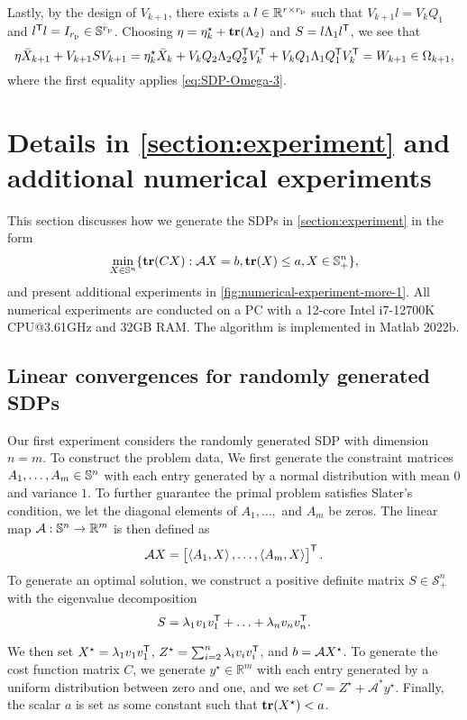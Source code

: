 \documentclass[11pt]{article}
\begin{document}
Lastly, by the design of $V_{k+1}$, there exists a $l \in \mathbb{R}^{r \times r_{\mathrm{p}}}$  such that $V_{k+1}l=V_kQ_1$ and $l^{\mathsf{ T}} l = I_{r_{\mathrm{p}}}\in \mathbb{S}^{r_\mathrm{p}}$. Choosing $\eta = \eta^\star_k + \mathop{\bf tr}(\Lambda_2)$ and $S = l \Lambda_1 l^{\mathsf{ T}}$, we see that $$\eta \Bar{X}_{k+1} + V_{k+1} S V_{k+1} = \eta^\star_k \bar{X}_{k} + V_k Q_2 \Lambda_2 Q_2^{\mathsf{ T}} V_k^{\mathsf{ T}} + V_k Q_1 \Lambda_1 Q_1^{\mathsf{ T}} V_k^{\mathsf{ T}} =W_{k+1} \in \Omega_{k+1},$$
where the first equality applies \eqref{eq:SDP-Omega-3}.


\section{Details in \cref{section:experiment} and additional numerical experiments}
\label{apx:section:detail-numerical}
This section discusses how we generate the SDPs in \cref{section:experiment} in the form 
\begin{align*}
    \min_{X \in \mathbb{S}^n} \{ \mathop{\bf tr}(CX) : \mathcal{A} X = b, \mathop{\bf tr}(X) \leq a ,X \in \mathbb{S}^n_+\},
\end{align*}
and present additional experiments in \cref{fig:numerical-experiment-more-1}. All numerical experiments are conducted on a PC with a 12-core Intel i7-12700K CPU@3.61GHz and 32GB RAM. The algorithm is implemented in Matlab 2022b. 
\subsection{Linear convergences for randomly generated SDPs}
\label{apx:subsection-randomly}
Our first experiment considers the randomly generated SDP with dimension $n = m.$ To construct the problem data, We first generate the constraint matrices $A_1, \ldots, A_m \in \mathbb{S}^n$ with each entry generated by a normal distribution with mean $0$ and variance $1$.
To further guarantee the primal problem satisfies Slater's condition, we let the diagonal elements of $A_1, \ldots,$ and $ A_m$ be zeros. The linear map $\mathcal{A} : \mathbb{S}^n \to \mathbb{R}^m$ is then defined as 
\begin{align*}
    \mathcal{A} X = \begin{bmatrix}
        \left \langle A_1, X \right\rangle,\ldots,\left \langle A_m, X \right\rangle
    \end{bmatrix}^{\mathsf{ T}}.
\end{align*}
To generate an optimal solution, we construct a positive definite matrix \( S \in \mathcal{S}_+^n \) with the eigenvalue decomposition
\[
S =\lambda_1  v_1  v_1^{\mathsf{ T}} + \ldots + \lambda_n v_n  v_n^{\mathsf{ T}}.
\]

We then set \( X^\star = \lambda_1 v_1 v_1^{\mathsf{ T}} \), \( Z^\star = \sum_{i=2}^n \lambda_i v_i v_i^{\mathsf{ T}} \), and \( b = \mathcal{A} X^\star \). To generate the cost function matrix \( C \), we generate \( y^\star \in \mathbb{R}^m \) with each entry generated by a uniform distribution between zero and one, and we set \( C = Z^\star + \mathcal{A}^*y^\star  \). Finally, the scalar $a$ is set as some constant such that $\mathop{\bf tr}(X^\star) < a$. 
\end{document}
